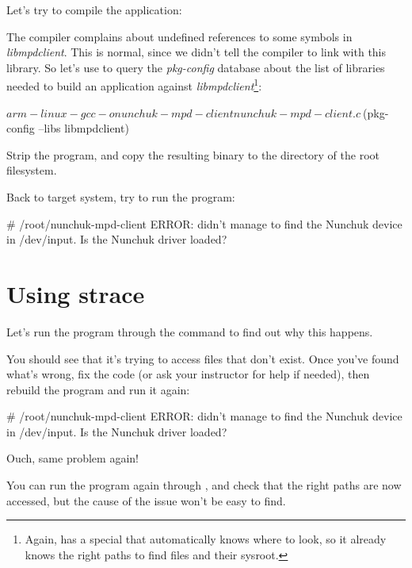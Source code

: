 Let's try to compile the application:


The compiler complains about undefined references to some symbols in
{\em libmpdclient}. This is normal, since we didn't tell the compiler
to link with this library. So let's use  to query the
{\em pkg-config} database about the list of libraries needed to build
an application against {\em libmpdclient}\footnote{Again,
 has a special  that
automatically knows where to look, so it already knows the right paths
to find  files and their sysroot.}:

\begin{bashinput}
$ arm-linux-gcc -o nunchuk-mpd-client nunchuk-mpd-client.c \
$(pkg-config --libs libmpdclient)
\end{bashinput}

Strip the  program, and copy
the resulting binary to the  directory of the root
filesystem.

Back to target system, try to run the program:

\begin{bashinput}
# /root/nunchuk-mpd-client
ERROR: didn't manage to find the Nunchuk device in /dev/input. Is the Nunchuk driver loaded?
\end{bashinput}

\section{Using strace}

Let's run the program through the  command to find out why
this happens.

You should see that it's trying to access files that don't exist.
Once you've found what's wrong, fix the code (or ask your instructor for
help if needed), then rebuild the program and run it again:

\begin{bashinput}
# /root/nunchuk-mpd-client
ERROR: didn't manage to find the Nunchuk device in /dev/input. Is the Nunchuk driver loaded?
\end{bashinput}

Ouch, same problem again!

You can run the program again through , and check that the
right paths are now accessed, but the cause of the issue won't be easy
to find.

